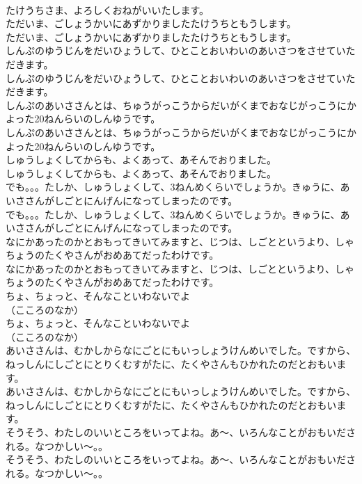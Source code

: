 \documentclass[8pt]{extreport}
\begin{document}
\begin{CJK}{UTF8}{min}
\\	たけうちさま、よろしくおねがいいたします。
\\	ただいま、ごしょうかいにあずかりましたたけうちともうします。
\\	ただいま、ごしょうかいにあずかりましたたけうちともうします。
\\	しんぷのゆうじんをだいひょうして、ひとことおいわいのあいさつをさせていただきます。
\\	しんぷのゆうじんをだいひょうして、ひとことおいわいのあいさつをさせていただきます。
\\	しんぷのあいささんとは、ちゅうがっこうからだいがくまでおなじがっこうにかよった20ねんらいのしんゆうです。
\\	しんぷのあいささんとは、ちゅうがっこうからだいがくまでおなじがっこうにかよった20ねんらいのしんゆうです。
\\	しゅうしょくしてからも、よくあって、あそんでおりました。
\\	しゅうしょくしてからも、よくあって、あそんでおりました。
\\	でも。。。たしか、しゅうしょくして、3ねんめくらいでしょうか。きゅうに、あいささんがしごとにんげんになってしまったのです。
\\	でも。。。たしか、しゅうしょくして、3ねんめくらいでしょうか。きゅうに、あいささんがしごとにんげんになってしまったのです。
\\	なにかあったのかとおもってきいてみますと、じつは、しごとというより、しゃちょうのたくやさんがおめあてだったわけです。
\\	なにかあったのかとおもってきいてみますと、じつは、しごとというより、しゃちょうのたくやさんがおめあてだったわけです。
\\	ちょ、ちょっと、そんなこといわないでよ
\\	（こころのなか）
\\	ちょ、ちょっと、そんなこといわないでよ
\\	（こころのなか）
\\	あいささんは、むかしからなにごとにもいっしょうけんめいでした。ですから、ねっしんにしごとにとりくむすがたに、たくやさんもひかれたのだとおもいます。
\\	あいささんは、むかしからなにごとにもいっしょうけんめいでした。ですから、ねっしんにしごとにとりくむすがたに、たくやさんもひかれたのだとおもいます。
\\	そうそう、わたしのいいところをいってよね。あ～、いろんなことがおもいだされる。なつかしい～。。
\\	そうそう、わたしのいいところをいってよね。あ～、いろんなことがおもいだされる。なつかしい～。。

\end{CJK}
\end{document}
